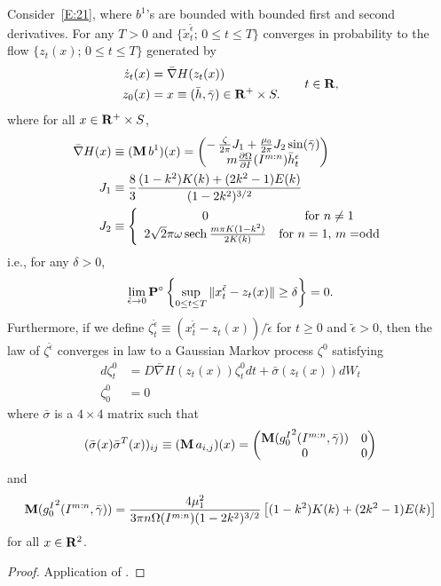 \begin{theorem}
\label{T:Khasminskii}
Consider~\eqref{E:21}, where $b^1$'s are bounded with bounded first and second derivatives. For any $T>0$ and $\{\tilde x^{\tilde\epsilon}_t;\, 0\le t\le T\}$ converges in probability to the flow $\{z_t(x);\, 0\le t\le T\}$ generated by
\begin{equation}
\begin{aligned}
\dot z_t(x) &= \bar \nabla H(z_t(x))\\
z_0(x) &= x \equiv (\bar{h},\bar{\gamma})\in\mathbf R^+\times S.
\end{aligned}\qquad t \in \mathbf R,
\label{e:flow} 
\end{equation}
where for all $x\in \mathbf R^+\times S$,
\[
\begin{aligned}
\bar \nabla H(x) &\equiv (\operatorname{\mathbf M} b^1)(x) = \begin{pmatrix} -\,
\frac{\zeta}{2\pi} J_{1} + \frac{\mu_0}{2\pi} J_{2} \sin
(\bar{\gamma})
\\  m\frac{\partial \Omega}{\partial I} (I^{m:n}) {\bar
h}_t^\epsilon
\end{pmatrix} \\
J_1 &\equiv \frac83 \frac{(1-k^2) K(k) +(2k^2-1)E(k)}{(1-2k^2)^{3/2}}\\
J_2 &\equiv \left\{ \begin{array}{cc}
0 & \mbox{for $n \neq 1$}\\
2\sqrt{2}\pi \omega \operatorname{sech} \frac{m\pi K(1-k^2)}{2K(k)} & \mbox{for $n = 1$, $m=$odd}     \end{array} \right.
\end{aligned}
\]
i.e., for any $\delta>0$,
\[
\lim_{{\tilde\epsilon} \to 0} \mathbf P^\circ\left\{\sup_{0\le t\le T}\| x^{\tilde\epsilon}_t - z_t(x)\|\ge \delta\right\} = 0.
\]
Furthermore, if we define $\zeta_t^{\tilde\epsilon}\equiv(x^{\tilde\epsilon}_t - z_t(x))/{\tilde\epsilon}$ for $t \ge 0$ and $\tilde\epsilon>0$, then the law of $\zeta^{\tilde\epsilon}$ converges in law to a Gaussian Markov process $\zeta^0$ satisfying
\begin{align*}
d \zeta_t^0 &= D \bar \nabla H (z_t(x)) \zeta_t^0 dt + \bar \sigma (z_t(x)) dW_t\\
\zeta_0^0&=0
\end{align*}
where $\bar \sigma$ is a $4 \times 4$ matrix such that
\begin{equation*}
(\bar \sigma(x) \bar \sigma^T(x))_{ij} \equiv (\operatorname{\mathbf M} a_{i,j})(x)
=\begin{pmatrix} \operatorname{\mathbf M}({g^I_0}^2(I^{m:n},{\bar \gamma})) & 0\\ 0 & 0\end{pmatrix}
\end{equation*}
and
\[
\operatorname{\mathbf M}({g^I_0}^2(I^{m:n},{\bar \gamma})) = \frac{4 \mu_1^2}{3\pi n\Omega(I^{m:n}) (1 - 2k^2)^{3/2}}\left[(1 - k^2) K(k)+(2k^2 - 1)E(k)\right]
\]
for all $x \in \mathbf R^2$.
\end{theorem}
\begin{proof}
Application of \citet{khasminskii66:_stoch_proc}.
\end{proof}

